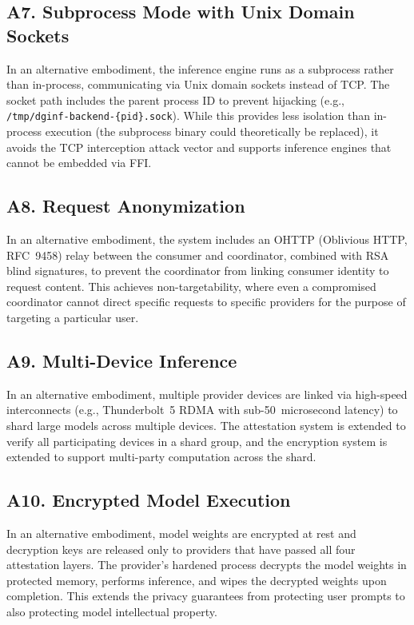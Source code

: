 \documentclass[11pt,letterpaper]{article}
\begin{document}
\subsection{A7. Subprocess Mode with Unix Domain Sockets}

In an alternative embodiment, the inference engine runs as a subprocess rather than in-process, communicating via Unix domain sockets instead of TCP. The socket path includes the parent process ID to prevent hijacking (e.g., \texttt{/tmp/dginf-backend-\{pid\}.sock}). While this provides less isolation than in-process execution (the subprocess binary could theoretically be replaced), it avoids the TCP interception attack vector and supports inference engines that cannot be embedded via FFI.

\subsection{A8. Request Anonymization}

In an alternative embodiment, the system includes an OHTTP (Oblivious HTTP, RFC~9458) relay between the consumer and coordinator, combined with RSA blind signatures, to prevent the coordinator from linking consumer identity to request content. This achieves non-targetability, where even a compromised coordinator cannot direct specific requests to specific providers for the purpose of targeting a particular user.

\subsection{A9. Multi-Device Inference}

In an alternative embodiment, multiple provider devices are linked via high-speed interconnects (e.g., Thunderbolt~5 RDMA with sub-50~microsecond latency) to shard large models across multiple devices. The attestation system is extended to verify all participating devices in a shard group, and the encryption system is extended to support multi-party computation across the shard.

\subsection{A10. Encrypted Model Execution}

In an alternative embodiment, model weights are encrypted at rest and decryption keys are released only to providers that have passed all four attestation layers. The provider's hardened process decrypts the model weights in protected memory, performs inference, and wipes the decrypted weights upon completion. This extends the privacy guarantees from protecting user prompts to also protecting model intellectual property.
\end{document}
